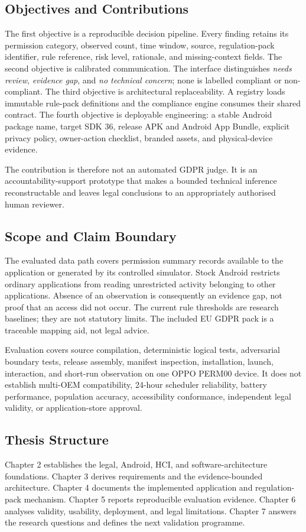 \subsection{Objectives and Contributions}

The first objective is a reproducible decision pipeline. Every finding retains its permission category, observed count, time window, source, regulation-pack identifier, rule reference, risk level, rationale, and missing-context fields. The second objective is calibrated communication. The interface distinguishes \emph{needs review}, \emph{evidence gap}, and \emph{no technical concern}; none is labelled compliant or non-compliant. The third objective is architectural replaceability. A registry loads immutable rule-pack definitions and the compliance engine consumes their shared contract. The fourth objective is deployable engineering: a stable Android package name, target SDK 36, release APK and Android App Bundle, explicit privacy policy, owner-action checklist, branded assets, and physical-device evidence.

The contribution is therefore not an automated GDPR judge. It is an accountability-support prototype that makes a bounded technical inference reconstructable and leaves legal conclusions to an appropriately authorised human reviewer.

\subsection{Scope and Claim Boundary}

The evaluated data path covers permission summary records available to the application or generated by its controlled simulator. Stock Android restricts ordinary applications from reading unrestricted activity belonging to other applications. Absence of an observation is consequently an evidence gap, not proof that an access did not occur. The current rule thresholds are research baselines; they are not statutory limits. The included EU GDPR pack is a traceable mapping aid, not legal advice.

Evaluation covers source compilation, deterministic logical tests, adversarial boundary tests, release assembly, manifest inspection, installation, launch, interaction, and short-run observation on one OPPO PERM00 device. It does not establish multi-OEM compatibility, 24-hour scheduler reliability, battery performance, population accuracy, accessibility conformance, independent legal validity, or application-store approval.

\subsection{Thesis Structure}

Chapter 2 establishes the legal, Android, HCI, and software-architecture foundations. Chapter 3 derives requirements and the evidence-bounded architecture. Chapter 4 documents the implemented application and regulation-pack mechanism. Chapter 5 reports reproducible evaluation evidence. Chapter 6 analyses validity, usability, deployment, and legal limitations. Chapter 7 answers the research questions and defines the next validation programme.
